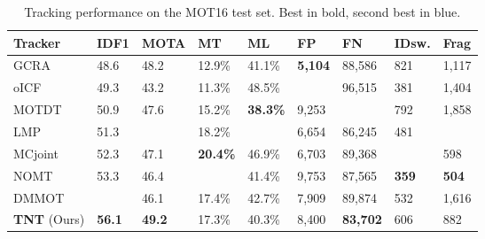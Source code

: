 \documentclass[10pt,twocolumn,letterpaper]{article}
\begin{document}
\begin{table*}
\begin{center}
\begin{tabular}{|L{2.9cm}|C{1.2cm}|C{1.3cm}|C{1.2cm}|C{1.2cm}|C{1.2cm}|C{1.2cm}|C{1.2cm}|C{1.2cm}|}
\hline
Tracker & IDF1  & MOTA  & MT  & ML  & FP  & FN  & IDsw.  & Frag  \\
\hline\hline
GCRA \cite{ma2018trajectory} & 48.6 & 48.2 & 12.9\% & 41.1\% & \textbf{5,104} & 88,586 & 821 & 1,117 \\
oICF \cite{kieritz2016online} & 49.3 & 43.2 & 11.3\% & 48.5\% & \noindent\color{cyan}{6,651} & 96,515 & 381 & 1,404 \\
MOTDT \cite{long2018real} & 50.9 & 47.6 & 15.2\% & \textbf{38.3\%} & 9,253 & \noindent\color{cyan}{85,431} & 792 & 1,858 \\
LMP \cite{tang2017multiple} & 51.3 & \noindent\color{cyan}{48.8} & 18.2\% & \noindent\color{cyan}{40.1\%} & 6,654 & 86,245 & 481 & \noindent\color{cyan}{595} \\
MCjoint \cite{keuper2016multi} & 52.3 & 47.1 & \textbf{20.4\%} & 46.9\% & 6,703 & 89,368 & \noindent\color{cyan}{370} & 598 \\
NOMT \cite{choi2015near} & 53.3 & 46.4 & \noindent\color{cyan}{18.3\%} & 41.4\% & 9,753 & 87,565 & \textbf{359} & \textbf{504} \\
DMMOT \cite{zhu2018online} & \noindent\color{cyan}{54.8} & 46.1 & 17.4\% & 42.7\% & 7,909 & 89,874 & 532 & 1,616 \\
\hline
\textbf{TNT} (Ours) & \textbf{56.1} & \textbf{49.2} & 17.3\% & 40.3\% & 8,400 & \textbf{83,702} & 606 & 882 \\
\hline
\end{tabular}
\end{center}
\caption{Tracking performance on the MOT16 test set. Best in bold, second best in blue. 
}
\label{tab:mot16}
\end{table*}
\end{document}
